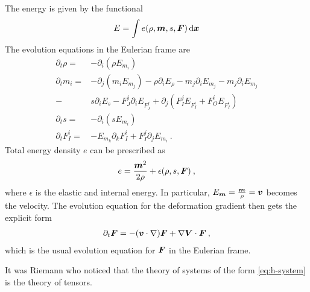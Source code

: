 \begin{example}
    The energy is given by the functional
    \begin{align}
        E = \int e(\rho, \boldsymbol{m}, s, \boldsymbol{F}) \, \mathrm{d} \boldsymbol{x}
    \end{align}
    The evolution equations in the Eulerian frame are
    \begin{align}
        \partial_t \rho =& - \partial_i (\rho E_{m_i}) 
        \\
        \partial_t m_i =& - \partial_j(m_i E_{m_j}) - \rho \partial_i E_\rho - m_j \partial_i E_{m_j} - m_j \partial_i E_{m_j} 
        \\
        -& s \partial_i E_s - F^j_J \partial_i E_{F^j_J} + \partial_j(F^j_I E_{F^i_I} + F^i_O E_{F^i_I}) 
        \\
        \partial_t s =& - \partial_i (sE_{m_i})
        \\
        \partial_t F^i_I =& - E_{m_k} \partial_k F^i_I + F^j_I \partial_j E_{m_i} \:.
    \end{align}
    Total energy density $e$ can be prescribed as
    \begin{align}
        e = \frac{\boldsymbol{m}^2}{2 \rho} + \epsilon(\rho,s , \boldsymbol{F}) \:,
    \end{align}
    where $\epsilon$ is the elastic and internal energy. In particular, $E_{\boldsymbol{m}} = \frac{\boldsymbol{m}}{\rho} = \boldsymbol{v}$ becomes the velocity. The evolution equation for the deformation gradient then gets the explicit form
    \begin{align}
        \partial_t \boldsymbol{F} = -(\boldsymbol{v} \cdot \nabla) \boldsymbol{F} + \nabla \boldsymbol{V} \cdot \boldsymbol{F} \:,
    \end{align}
    which is the usual evolution equation for $\boldsymbol{F}$ in the Eulerian frame.
\end{example}

It was Riemann who noticed that the theory of systems of the form \eqref{eq:h-system} is the
theory of tensors.

